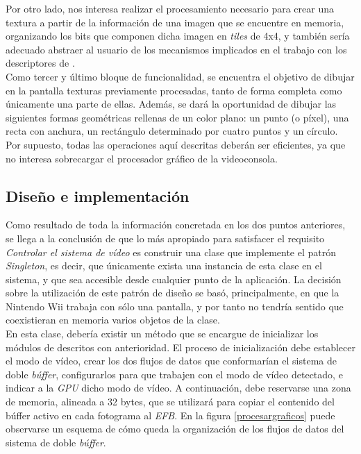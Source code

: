 Por otro lado, nos interesa realizar el procesamiento necesario para crear una textura a partir de la información de una imagen que se encuentre en memoria, organizando los bits que componen dicha imagen en \emph{tiles} de 4x4, y también sería adecuado abstraer al usuario de los mecanismos implicados en el trabajo con los descriptores de .\\

Como tercer y último bloque de funcionalidad, se encuentra el objetivo de dibujar en la pantalla texturas previamente procesadas, tanto de forma completa como únicamente una parte de ellas. Además, se dará la oportunidad de dibujar las siguientes formas geométricas rellenas de un color plano: un punto (o píxel), una recta con anchura, un rectángulo determinado por cuatro puntos y un círculo.\\

Por supuesto, todas las operaciones aquí descritas deberán ser eficientes, ya que no interesa sobrecargar el procesador gráfico de la videoconsola.

\subsection{Diseño e implementación}

Como resultado de toda la información concretada en los dos puntos anteriores, se llega a la conclusión de que lo más apropiado para satisfacer el requisito \emph{Controlar el sistema de vídeo} es construir una clase que implemente el patrón \emph{Singleton}, es decir, que únicamente exista una instancia de esta clase en el sistema, y que sea accesible desde cualquier punto de la aplicación. La decisión sobre la utilización de este patrón de diseño se basó, principalmente, en que la Nintendo Wii trabaja con sólo una pantalla, y por tanto no tendría sentido que coexistieran en memoria varios objetos de la clase.\\

En esta clase, debería existir un método que se encargue de inicializar los módulos de  descritos con anterioridad. El proceso de inicialización debe establecer el modo de vídeo, crear los dos flujos de datos que conformarían el sistema de doble \emph{búffer}, configurarlos para que trabajen con el modo de vídeo detectado, e indicar a la \emph{GPU} dicho modo de vídeo. A continuación, debe reservarse una zona de memoria, alineada a 32 bytes, que se utilizará para copiar el contenido del búffer activo en cada fotograma al \emph{EFB}. En la figura \ref{procesargraficos} puede observarse un esquema de cómo queda la organización de los flujos de datos del sistema de doble \emph{búffer}.\\

